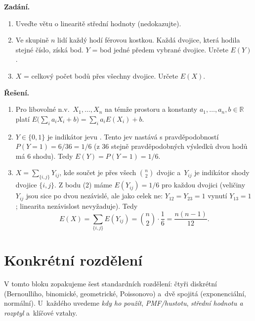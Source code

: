 \documentclass[11pt,a4paper]{article}
\newcommand{\R}{\mathbb{R}}
\begin{document}
\begin{priklad} \par

\textbf{Zadání.}
\begin{enumerate}[label=(\arabic*)]
  \item Uveďte větu o linearitě střední hodnoty (nedokazujte).
  \item Ve skupině $n$ lidí každý hodí férovou kostkou. Každá dvojice, která hodila stejné číslo, získá bod. $Y$ = bod jedné předem vybrané dvojice. Určete $E(Y)$.
  \item $X$ = celkový počet bodů přes všechny dvojice. Určete $E(X)$.
\end{enumerate}

\textbf{Řešení.}

\begin{enumerate}[label=(\arabic*)]
  \item Pro libovolné n.v.\ $X_1,\dots,X_n$ na témže prostoru a konstanty $a_1,\dots,a_n,b\in\R$ platí $E\bigl(\sum_i a_i X_i+b\bigr)=\sum_i a_i E(X_i)+b$.
  \item $Y\in\{0,1\}$ je indikátor jevu . Tento jev nastává s pravděpodobností $P(Y=1)=6/36=1/6$ (z 36 stejně pravděpodobných výsledků dvou hodů má $6$ shodu). Tedy $E(Y)=P(Y=1)=\boxed{1/6}$.
  \item $X=\sum_{\{i,j\}}Y_{ij}$, kde součet je přes všech $\binom{n}{2}$ dvojic a~$Y_{ij}$ je indikátor shody dvojice $\{i,j\}$. Z bodu (2) máme $E(Y_{ij})=1/6$ pro každou dvojici (veličiny $Y_{ij}$ jsou sice po dvou nezávislé, ale jako celek ne: $Y_{12}=Y_{23}=1$ vynutí $Y_{13}=1$; linearita nezávislost nevyžaduje). Tedy
  \[
  E(X)=\sum_{\{i,j\}}E(Y_{ij})=\binom{n}{2}\cdot\frac{1}{6}=\boxed{\frac{n(n-1)}{12}}.
  \]
\end{enumerate}
\end{priklad}

\section{Konkrétní rozdělení}

V tomto bloku zopakujeme šest standardních rozdělení: čtyři diskrétní (Bernoulliho, binomické, geometrické, Poissonovo) a~dvě spojitá (exponenciální, normální). U~každého uvedeme \emph{kdy ho použít}, \emph{PMF/hustotu}, \emph{střední hodnotu a rozptyl} a~klíčové vztahy.
\end{document}
